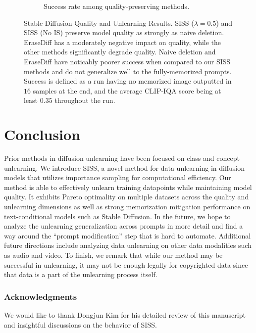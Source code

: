 \documentclass{article} \usepackage{iclr2025_conference,times}
\begin{document}
\begin{figure}
\begin{subfigure}[b]{0.48\textwidth}
        \caption{Success rate among quality-preserving methods.}
        \label{fig:sd_success}
    \end{subfigure}
    \caption{Stable Diffusion Quality and Unlearning Results. SISS ($\lambda=0.5$) and SISS (No IS) preserve model quality as strongly as naive deletion. EraseDiff has a moderately negative impact on quality, while the other methods significantly degrade quality. Naive deletion and EraseDiff have noticably poorer success when compared to our SISS methods and do not generalize well to the fully-memorized prompts. Success is defined as a run having no memorized image outputted in $16$ samples at the end, and the average CLIP-IQA score being at least $0.35$ throughout the run.}
\end{figure}

 




\section{Conclusion}

Prior methods in diffusion unlearning have been focused on class and concept unlearning. We introduce SISS, a novel method for data unlearning in diffusion models that utilizes importance sampling for computational efficiency. Our method is able to effectively unlearn training datapoints while maintaining model quality. It exhibits Pareto optimality on multiple datasets across the quality and unlearning dimensions as well as strong memorization mitigation performance on text-conditional models such as Stable Diffusion. In the future, we hope to analyze the unlearning generalization across prompts in more detail and find a way around the ``prompt modification'' step that is hard to automate. Additional future directions include analyzing data unlearning on other data modalities such as audio and video. To finish, we remark that while our method may be successful in unlearning, it may not be enough legally for copyrighted data since that data is a part of the unlearning process itself. 

\subsubsection*{Acknowledgments}
We would like to thank Dongjun Kim for his detailed review of this manuscript and insightful discussions on the behavior of SISS.
\end{document}
